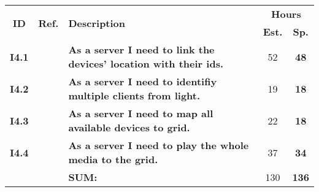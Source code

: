   \label{tab:sprint4stories}
 \def\arraystretch{1.25}
 
\begin{longtable}{ccXcc}

\toprule[0.5mm]
\multirow{2}{*}{\textbf{ID}} &
\multirow{2}{*}{\textbf{Ref.}} & \multirow{2}{*}{\textbf{Description}} & \multicolumn{2}{c}{\textbf{Hours}} \\
 					& & & \textbf{Est.} & \textbf{Sp.} \\
\midrule
\textbf{I4.1} 	& 	& {\bf As a server I need to link the devices' location with their ids.}	 &  52	& \textbf{48} \\

\textbf{I4.2} 	& 	& {\bf As a server I need to identifiy multiple clients from light.}		 &  19	& \textbf{18} \\

\textbf{I4.3} 	& 	& {\bf As a server I need to map all available devices to grid.} 			 & 22 & \textbf{18} \\	

\textbf{I4.4} 	& 	& {\bf As a server I need to play the whole media to the grid.} 			 & 37 & \textbf{34} \\
	
\midrule
		
				&& \textbf{SUM:}		&		130	& \textbf{136}
 \\																			
\bottomrule[0.5mm]
\end{longtable}

